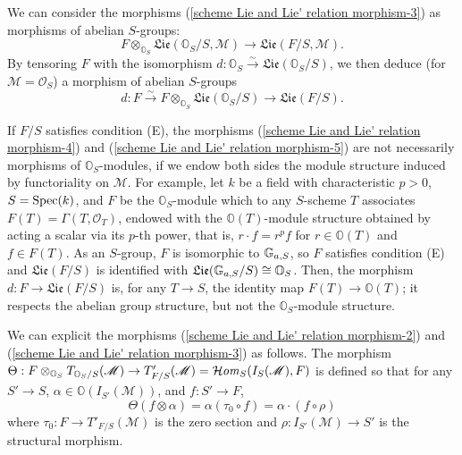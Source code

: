 We can consider the morphisms (\ref{scheme Lie and Lie' relation morphism-3}) as morphisms of abelian $S$-groups:
\begin{equation}\label{scheme Lie and Lie' relation morphism-4}
F\otimes_{\mathbb{O}_S}\mathfrak{Lie}(\mathbb{O}_S/S,\mathscr{M})\to\mathfrak{Lie}(F/S,\mathscr{M}).
\end{equation}
By tensoring $F$ with the isomorphism $d:\mathbb{O}_S\stackrel{\sim}{\to}\mathfrak{Lie}(\mathbb{O}_S/S)$, we then deduce (for $\mathscr{M}=\mathscr{O}_S$) a morphism of abelian $S$-groups
\begin{equation}\label{scheme Lie and Lie' relation morphism-5}
d:F\stackrel{\sim}{\to} F\otimes_{\mathbb{O}_S}\mathfrak{Lie}(\mathbb{O}_S/S)\to\mathfrak{Lie}(F/S).
\end{equation}

\begin{remark}\label{scheme O_S-module morphism F to Lie not module}
If $F/S$ satisfies condition (E), the morphisms (\ref{scheme Lie and Lie' relation morphism-4}) and (\ref{scheme Lie and Lie' relation morphism-5}) are not necessarily morphisms of $\mathbb{O}_S$-modules, if we endow both sides the module structure induced by functoriality on $\mathscr{M}$. For example, let $k$ be a field with characteristic $p>0$, $S=\mathrm{Spec}(k)$, and $F$ be the $\mathbb{O}_S$-module which to any $S$-scheme $T$ associates $F(T)=\Gamma(T,\mathscr{O}_T)$, endowed with the $\mathbb{O}(T)$-module structure obtained by acting a scalar via its $p$-th power, that is, $r\cdot f=r^pf$ for $r\in\mathbb{O}(T)$ and $f\in F(T)$. As an $S$-group, $F$ is isomorphic to $\mathbb{G}_{a,S}$, so $F$ satisfies condition (E) and $\mathfrak{Lie}(F/S)$ is identified with $\mathfrak{Lie}(\mathbb{G}_{a,S}/S)\cong\mathbb{O}_S$. Then, the morphism $d:F\to\mathfrak{Lie}(F/S)$ is, for any $T\to S$, the identity map $F(T)\to\mathbb{O}(T)$; it respects the abelian group structure, but not the $\mathbb{O}_S$-module structure.
\end{remark}

\begin{remark}
We can explicit the morphisms (\ref{scheme Lie and Lie' relation morphism-2}) and (\ref{scheme Lie and Lie' relation morphism-3}) as follows. The morphism $\Theta:F\otimes_{\mathbb{O}_S}T_{\mathbb{O}_S/S}(\mathscr{M})\to T'_{F/S}(\mathscr{M})=\operatorname{\mathcal{H}\hspace*{-0.4pt}\textit{om}\hspace{0.5pt}}_S(I_S(\mathscr{M}),F)$ is defined so that for any $S'\to S$, $\alpha\in\mathbb{O}(I_{S'}(\mathscr{M}))$, and $f:S'\to F$,
\[\Theta(f\otimes\alpha)=\alpha(\tau_0\circ f)=\alpha\cdot(f\circ\rho)\]
where $\tau_0:F\to T'_{F/S}(\mathscr{M})$ is the zero section and $\rho:I_{S'}(\mathscr{M})\to S'$ is the structural morphism.
\end{remark}

